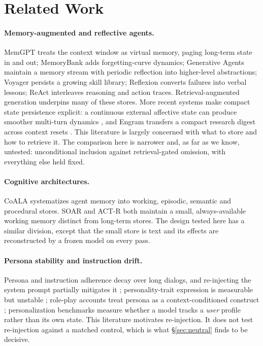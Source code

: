 \documentclass[11pt]{article}
\begin{document}
\section{Related Work}
\paragraph{Memory-augmented and reflective agents.} MemGPT \citep{packer2023} treats the context window as virtual memory, paging long-term state in and out; MemoryBank \citep{zhong2024memorybank} adds forgetting-curve dynamics; Generative Agents \citep{park2023} maintain a memory stream with periodic reflection into higher-level abstractions; Voyager \citep{wang2023voyager} persists a growing skill library; Reflexion \citep{shinn2023} converts failures into verbal lessons; ReAct \citep{yao2023react} interleaves reasoning and action traces. Retrieval-augmented generation \citep{lewis2020rag} underpins many of these stores. More recent systems make compact state persistence explicit: a continuous external affective state can produce smoother multi-turn dynamics \citep{subaharan2026state}, and Engram transfers a compact research digest across context resets \citep{karimi2026engram}. This literature is largely concerned with what to store and how to retrieve it. The comparison here is narrower and, as far as we know, untested: unconditional inclusion against retrieval-gated omission, with everything else held fixed.

\paragraph{Cognitive architectures.} CoALA \citep{sumers2024coala} systematizes agent memory into working, episodic, semantic and procedural stores. SOAR \citep{laird2012soar} and ACT-R \citep{anderson2004actr} both maintain a small, always-available working memory distinct from long-term stores. The design tested here has a similar division, except that the small store is text and its effects are reconstructed by a frozen model on every pass.

\paragraph{Persona stability and instruction drift.} Persona and instruction adherence decay over long dialogs, and re-injecting the system prompt partially mitigates it \citep{li2024stability}; personality-trait expression is measurable but unstable \citep{serapio2023personality,jiang2024personallm}; role-play accounts treat persona as a context-conditioned construct \citep{shanahan2023}; personalization benchmarks \citep{salemi2024lamp} measure whether a model tracks a \emph{user} profile rather than its own state. This literature motivates re-injection. It does not test re-injection against a matched control, which is what \S\ref{sec:neutral} finds to be decisive.
\end{document}

